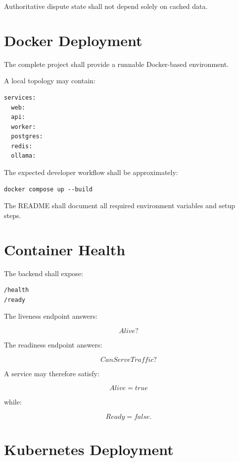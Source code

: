 \documentclass[11pt,a4paper]{article}
\begin{document}
Authoritative dispute state shall not depend solely on cached data.

\section{Docker Deployment}

The complete project shall provide a runnable Docker-based environment.

A local topology may contain:

\begin{lstlisting}
services:
  web:
  api:
  worker:
  postgres:
  redis:
  ollama:
\end{lstlisting}

The expected developer workflow shall be approximately:

\begin{lstlisting}
docker compose up --build
\end{lstlisting}

The README shall document all required environment variables and setup
steps.

\section{Container Health}

The backend shall expose:

\begin{lstlisting}
/health
/ready
\end{lstlisting}

The liveness endpoint answers:

\[
Alive?
\]

The readiness endpoint answers:

\[
CanServeTraffic?
\]

A service may therefore satisfy:

\[
Alive=true
\]

while:

\[
Ready=false.
\]

\section{Kubernetes Deployment}
\end{document}
